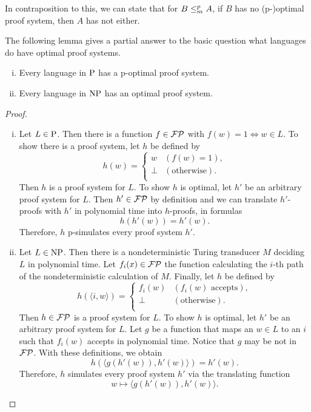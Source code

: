   In contraposition to this, we can state that for \(B \redmany A\), if \(B\) has no (p-)optimal proof system, then \(A\) has not either.

  The following lemma gives a partial answer to the basic question what languages do have optimal proof systems.

  \begin{lemma}
   \begin{enumerate}[(i)]
    \item Every language in \(\P\) has a p-optimal proof system.
    \item Every language in \(\NP\) has an optimal proof system.
   \end{enumerate}
  \end{lemma}

  \begin{proof}
    \begin{enumerate}[(i)]
      \item 
        Let \(L \in \P\). Then there is a function \(f \in \FP\) with \(f(w) = 1 \Leftrightarrow w \in L\). To show there is a proof system, let \(h\) be defined by
        \[
          h(w) =
          \begin{cases}
            w & (f(w) = 1), \\
            \perp & (\text{otherwise}). \\
          \end{cases}
        \]
        Then \(h\) is a proof system for \(L\). To show \(h\) is optimal, let \(h'\) be an arbitrary proof system for \(L\). Then \(h' \in \FP\) by definition and we can translate \(h'\)-proofs with \(h'\) in polynomial time into \(h\)-proofs, in formulas
        \[
          h(h'(w)) = h'(w).
        \]
        Therefore, \(h\) p-simulates every proof system \(h'\).
      \item
        Let \(L \in \NP\). Then there is a nondeterministic Turing transducer \(M\) deciding \(L\) in polynomial time. Let \(f_i(x) \in \FP\) the function calculating the \(i\)-th path of the nondeterministic calculation of \(M\). Finally, let \(h\) be defined by
        \[
          h(\langle i, w \rangle) =
          \begin{cases}
            f_i(w) & (f_i(w) \text{ accepts}), \\
            \perp & (\text{otherwise}). \\
          \end{cases}
        \]
        Then \(h \in \FP\) is a proof system for \(L\). To show \(h\) is optimal, let \(h'\) be an arbitrary proof system for \(L\). Let \(g\) be a function that maps an \(w \in L\) to an \(i\) such that \(f_i(w)\) accepts in polynomial time. Notice that \(g\) may be not in \(\FP\). With these definitions, we obtain
        \[
          h(\langle g(h'(w)), h'(w) \rangle) = h'(w).
        \]
        Therefore, \(h\) simulates every proof system \(h'\) via the translating function
          \[w \mapsto \langle g(h'(w)), h'(w) \rangle.\]
    \end{enumerate}
  \end{proof}

